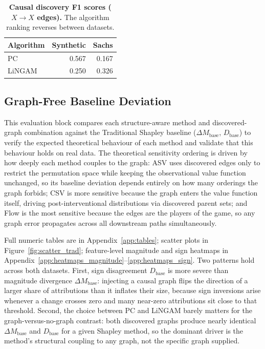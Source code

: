 \documentclass[12pt,letterpaper,twocolumn]{article}
\begin{document}
\begin{table}[t]
  \centering
  \footnotesize
  \caption{\textbf{Causal discovery F1 scores ($X \to X$ edges).} The algorithm ranking reverses between datasets.}
  \label{tab:discovery_f1}
  \begin{tabular}{lrr}
    \toprule
    \textbf{Algorithm} & \textbf{Synthetic} & \textbf{Sachs} \\
    \midrule
    PC        & 0.567 & 0.167 \\
    LiNGAM    & 0.250 & 0.326 \\
    \bottomrule
  \end{tabular}
\end{table}

\subsection{Graph-Free Baseline Deviation}
\label{sec:baseline}

This evaluation block compares each structure-aware method and discovered-graph
combination against the Traditional Shapley baseline ($\Delta M_{\text{base}}$,
$D_{\text{base}}$) to verify the expected theoretical behaviour of each method and
validate that this behaviour holds on real data. The theoretical sensitivity ordering
is driven by how deeply each method couples to the graph: ASV uses discovered edges
only to restrict the permutation space while keeping the observational value function
unchanged, so its baseline deviation depends entirely on how many orderings the graph
forbids; CSV is more sensitive because the graph enters the value function itself,
driving post-interventional distributions via discovered parent sets; and Flow is the
most sensitive because the edges are the players of the game, so any graph error
propagates across all downstream paths simultaneously.

Full numeric tables are in Appendix~\ref{app:tables}; scatter plots in
Figure~\ref{fig:scatter_trad}; feature-level magnitude and sign heatmaps in
Appendix~\ref{app:heatmaps_magnitude}--\ref{app:heatmaps_sign}. Two patterns hold across both datasets. First, sign
disagreement $D_{\text{base}}$ is more severe than magnitude divergence
$\Delta M_{\text{base}}$: injecting a causal graph flips the direction of a larger share
of attributions than it inflates their size, because sign inversions arise whenever a
change crosses zero and many near-zero attributions sit close to that threshold. Second,
the choice between PC and LiNGAM barely matters for the graph-versus-no-graph contrast:
both discovered graphs produce nearly identical $\Delta M_{\text{base}}$ and
$D_{\text{base}}$ for a given Shapley method, so the dominant driver is the method's
structural coupling to any graph, not the specific graph supplied.
\end{document}
